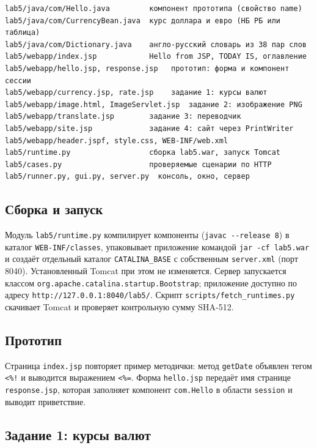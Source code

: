 \documentclass[14pt,a4paper]{extarticle}
\begin{document}
\begin{Verbatim}[fontsize=\scriptsize, frame=single, samepage=true]
lab5/java/com/Hello.java         компонент прототипа (свойство name)
lab5/java/com/CurrencyBean.java  курс доллара и евро (НБ РБ или таблица)
lab5/java/com/Dictionary.java    англо-русский словарь из 38 пар слов
lab5/webapp/index.jsp            Hello from JSP, TODAY IS, оглавление
lab5/webapp/hello.jsp, response.jsp   прототип: форма и компонент сессии
lab5/webapp/currency.jsp, rate.jsp    задание 1: курсы валют
lab5/webapp/image.html, ImageServlet.jsp  задание 2: изображение PNG
lab5/webapp/translate.jsp        задание 3: переводчик
lab5/webapp/site.jsp             задание 4: сайт через PrintWriter
lab5/webapp/header.jspf, style.css, WEB-INF/web.xml
lab5/runtime.py                  сборка lab5.war, запуск Tomcat
lab5/cases.py                    проверяемые сценарии по HTTP
lab5/runner.py, gui.py, server.py  консоль, окно, сервер
\end{Verbatim}

\subsection{Сборка и запуск}

Модуль \texttt{lab5/runtime.py} компилирует компоненты
(\texttt{javac -{}-release 8}) в каталог \texttt{WEB-INF/classes}, упаковывает
приложение командой \texttt{jar -cf lab5.war} и создаёт отдельный каталог
\texttt{CATALINA\_BASE} с собственным \texttt{server.xml} (порт 8040). Установленный
Tomcat при этом не изменяется. Сервер запускается классом
\texttt{org.apache.catalina.startup.Bootstrap}; приложение доступно по адресу
\texttt{http://127.0.0.1:8040/lab5/}. Скрипт \texttt{scripts/fetch\_runtimes.py}
скачивает Tomcat и проверяет контрольную сумму SHA-512.

\subsection{Прототип}

Страница \texttt{index.jsp} повторяет пример методички: метод \texttt{getDate} объявлен
тегом \texttt{<\%!} и выводится выражением \texttt{<\%=}. Форма \texttt{hello.jsp}
передаёт имя странице \texttt{response.jsp}, которая заполняет компонент
\texttt{com.Hello} в области \texttt{session} и выводит приветствие.

\subsection{Задание 1: курсы валют}
\end{document}
